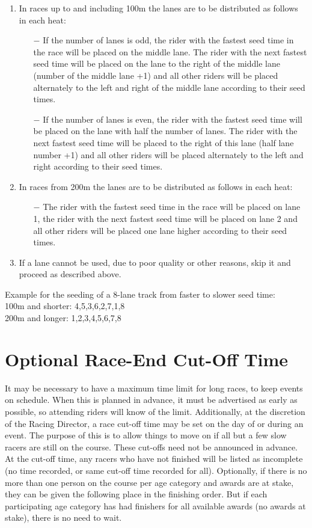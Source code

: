 \begin{enumerate}
\item In races up to and including 100m the lanes are to be distributed as follows in each heat:
  \begin{itemize}
  \item[$-$] If the number of lanes is odd, the rider with the fastest seed time in the race will be placed on the middle lane.
  The rider with the next fastest seed time will be placed on the lane to the right of the middle lane (number of the middle lane +1) and all other riders will be placed alternately to the left and right of the middle lane according to their seed times.
  \item[$-$] If the number of lanes is even, the rider with the fastest seed time will be placed on the lane with half the number of lanes.
  The rider with the next fastest seed time will be placed to the right of this lane (half lane number +1) and all other riders will be placed alternately to the left and right according to their seed times.
  \end{itemize}
\item In races from 200m the lanes are to be distributed as follows in each heat:
  \begin{itemize}
  \item[$-$] The rider with the fastest seed time in the race will be placed on lane 1, the rider with the next fastest seed time will be placed on lane 2 and all other riders will be placed one lane higher according to their seed times.
  \end{itemize}
\item If a lane cannot be used, due to poor quality or other reasons, skip it and proceed as described above.
\end{enumerate}

Example for the seeding of a 8-lane track from faster to slower seed time:\\
100m and shorter: 4,5,3,6,2,7,1,8\\
200m and longer: 1,2,3,4,5,6,7,8

\section{Optional Race-End Cut-Off Time}
It may be necessary to have a maximum time limit for long races, to keep events on schedule.
When this is planned in advance, it must be advertised as early as possible, so attending riders will know of the limit.
Additionally, at the discretion of the Racing Director, a race cut-off time may be set on the day of or during an event.
The purpose of this is to allow things to move on if all but a few slow racers are still on the course.
These cut-offs need not be announced in advance.
At the cut-off time, any racers who have not finished will be listed as incomplete (no time recorded, or same cut-off time recorded for all).
Optionally, if there is no more than one person on the course per age category and awards are at stake, they can be given the following place in the finishing order.
But if each participating age category has had finishers for all available awards (no awards at stake), there is no need to wait.
